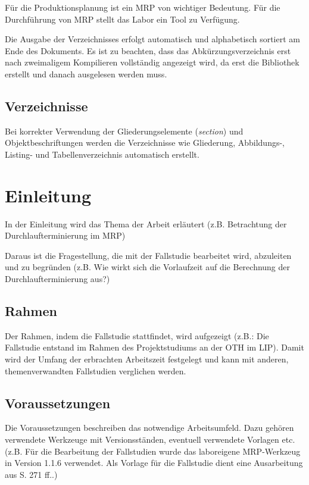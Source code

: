 \documentclass[12pt,a4paper, listof=entryprefix, bibliography=totocnumbered,toc=listofnumbered,lof=listofnumbered]{scrartcl}
\newcounter{verzeichnis}
\begin{document}
Für die Produktionsplanung ist ein \gls{MRP} von wichtiger Bedeutung. Für die Durchführung von \gls{MRP} stellt das Labor ein Tool zu Verfügung. 

Die Ausgabe der Verzeichnisses erfolgt automatisch und alphabetisch sortiert am Ende des Dokuments. Es ist zu beachten, dass das Abkürzungsverzeichnis erst nach zweimaligem Kompilieren vollständig angezeigt wird, da erst die Bibliothek erstellt und danach ausgelesen werden muss.

\subsection{Verzeichnisse}
\label{ch:verzeichnisse}
Bei korrekter Verwendung der Gliederungselemente (\textit{section}) und Objektbeschriftungen werden die Verzeichnisse wie Gliederung, Abbildungs-, Listing- und Tabellenverzeichnis automatisch erstellt.

\pagebreak

\section{Einleitung}
\label{ch:einleitung}
In der Einleitung wird das Thema der Arbeit erläutert (z.B. Betrachtung der Durchlaufterminierung im \gls{MRP})

Daraus ist die Fragestellung, die mit der Fallstudie bearbeitet wird, abzuleiten und zu begründen (z.B. Wie wirkt sich die Vorlaufzeit auf die Berechnung der Durchlaufterminierung aus?)

\subsection{Rahmen}
\label{ch:rahmen}
Der Rahmen, indem die Fallstudie stattfindet, wird aufgezeigt (z.B.: Die Fallstudie entstand im Rahmen des Projektstudiums an der \gls{OTH} im \gls{LIP}). Damit wird der Umfang der erbrachten Arbeitszeit festgelegt und kann mit anderen, themenverwandten Fallstudien verglichen werden.

\subsection{Voraussetzungen}
\label{ch:vorraussetzungen}
Die Voraussetzungen beschreiben das notwendige Arbeitsumfeld. Dazu gehören verwendete Werkzeuge mit Versionsständen, eventuell verwendete Vorlagen etc. (z.B. Für die Bearbeitung der Fallstudien wurde das laboreigene MRP-Werkzeug in Version 1.1.6 verwendet. Als Vorlage für die Fallstudie dient eine Ausarbeitung aus \cite{Herrmann.2009} S. 271 ff..)
\end{document}
